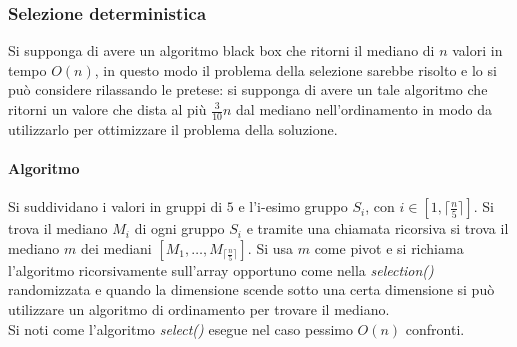 \subsubsection{Selezione deterministica}
Si supponga di avere un algoritmo black box che ritorni il mediano di $n$ valori in tempo $O(n)$, in questo modo il problema della selezione sarebbe risolto e lo si pu\`o considere
rilassando le pretese: si supponga di avere un tale algoritmo che ritorni un valore che dista al pi\`u $\frac{3}{10}n$ dal mediano nell'ordinamento in modo da utilizzarlo per ottimizzare
il problema della soluzione.
\paragraph{Algoritmo}
Si suddividano i valori in gruppi di $5$ e l'i-esimo gruppo $S_i$, con $i\in[1, \bigl\lceil\frac{n}{5}\bigr\rceil]$. Si trova il mediano $M_i$ di ogni gruppo $S_i$ e tramite una chiamata
ricorsiva si trova il mediano $m$ dei mediani $[M_1, \dots, M_{\lceil\frac{n}{5}\rceil}]$. Si usa $m$ come pivot e si richiama l'algoritmo ricorsivamente sull'array opportuno come
nella \emph{selection()} randomizzata e quando la dimensione scende sotto una certa dimensione si pu\`o utilizzare un algoritmo di ordinamento per trovare il mediano.\\

Si noti come l'algoritmo \emph{select()} esegue nel caso pessimo $O(n)$ confronti.
